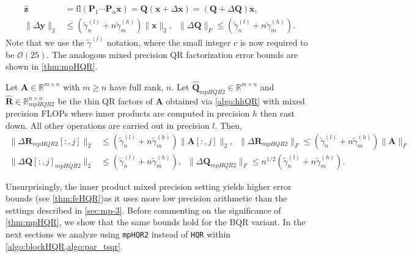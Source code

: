 \documentclass[review,onefignum,onetabnum]{siamart190516}
\newcommand{\R}{\mathbb{R}}
\newcommand{\bb}[1]{\mathbf{#1}}
\newcommand{\fl}{\mathrm{fl}}
\newcommand{\cO}{\mathcal{O}}
\begin{document}
\begin{align}
\hat{\bb{z}} &= \fl(\bb{P}_1\cdots\bb{P}_n\bb{x})=\bb{Q} (\bb{x} +\Delta \bb{x}) = (\bb{Q} + \Delta \bb{Q})\bb{x},\\
\|\Delta \bb{y}\|_2 &\leq (\tilde{\gamma}_n^{(l)}+n\tilde{\gamma}_m^{(h)})\|\bb{x}\|_2,\;\; \|\Delta \bb{Q}\|_F\leq (\tilde{\gamma}_n^{(l)}+n\tilde{\gamma}_m^{(h)}).\label{eqn:mp19.3}
\end{align} 
Note that we use the $\tilde{\gamma}^{(l)}$ notation, where the small integer $c$ is now required to be $\cO(25)$.
The analogous mixed precision QR factorization error bounds are shown in \cref{thm:mpHQR}.
\begin{theorem}
	\label{thm:mpHQR}
	Let $\bb{A}\in\R^{m\times n}$ with $m\geq n$ have full rank, $n$. 
	Let $\hat{\bb{Q}}_{mpHQR2}\in\R^{m\times n}$ and $\hat{\bb{R}}\in\R^{n\times n}_{mpHQR2}$ be the thin QR factors of $\bb{A}$ obtained via \cref{algo:hhQR} with mixed precision FLOPs where inner products are computed in precision $h$ then cast down.
	All other operations are carried out in precision $l$.
	Then,
	\begin{align}
	\|\Delta \bb{R}_{mpHQR2}[:,j]\|_2&\leq (\tilde{\gamma}_n^{(l)}+n\tilde{\gamma}_m^{(h)}) \|\bb{A}[:,j]\|_2,\;\; \|\Delta \bb{R}_{mpHQR2}\|_F\leq (\tilde{\gamma}_n^{(l)}+n\tilde{\gamma}_m^{(h)}) \|\bb{A}\|_F \label{eqn:mpHQR2R}\\
	\|\Delta \bb{Q}[:,j]_{mpHQR2}\|_2&\leq (\tilde{\gamma}_n^{(l)}+n\tilde{\gamma}_m^{(h)}),\;\; \|\Delta \bb{Q}_{mpHQR2}\|_F \leq n^{1/2} (\tilde{\gamma}_n^{(l)}+n\tilde{\gamma}_m^{(h)})\label{eqn:mpHQR2Q}.
	\end{align}
\end{theorem}
Unsurprisingly, the inner product mixed precision setting yields higher error bounds (see \cref{thm:feHQR})as it uses more low precision arithmetic than the settings described in \cref{sec:mp-3}. 
Before commenting on the significance of \cref{thm:mpHQR}, we show that the same bounds hold for the BQR variant.
In the next sections we analyze using {\tt mpHQR2} instead of {\tt HQR} within \cref{algo:blockHQR,algo:par_tsqr}.
\end{document}
